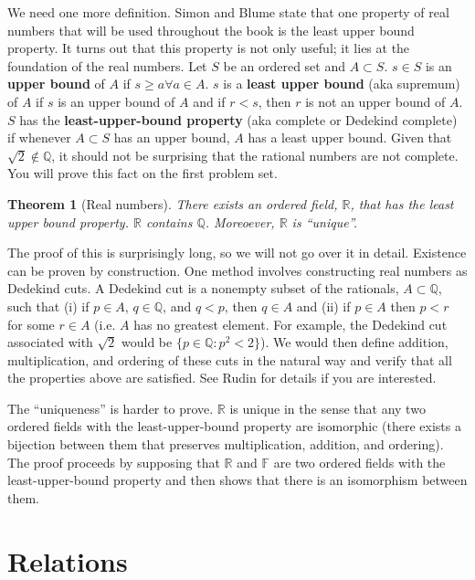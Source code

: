 \documentclass[12pt,reqno]{amsart}
\newtheorem{theorem}{Theorem}[section]
\theoremstyle{definition}
\begin{document}
We need one more definition. Simon and Blume state that one property
of real numbers that will be used throughout the book is the least
upper bound property. It turns out that this property is not only
useful; it lies at the foundation of the real numbers. Let $S$ be an
ordered set and $A \subset S$. $s \in S$ is an \textbf{upper bound} of
$A$ if $s \geq a \forall a \in A$. $s$ is a \textbf{least upper bound}
(aka supremum) of $A$ if $s$ is an upper bound of $A$ and if $r < s$,
then $r$ is not an upper bound of $A$. $S$ has the
\textbf{least-upper-bound property} (aka complete or Dedekind
complete) if whenever $A \subset S$ has an upper bound, $A$ has a
least upper bound. Given that $\sqrt{2} \not\in \mathbb{Q}$, it should
not be surprising that the rational numbers are not complete. You will
prove this fact on the first problem set. 

\begin{theorem}[Real numbers]
  There exists an ordered field, $\mathbb{R}$, that has the least
  upper bound property. $\mathbb{R}$ contains $\mathbb{Q}$. Moreoever,
  $\mathbb{R}$ is ``unique''.
\end{theorem}

The proof of this is surprisingly long, so we will not go over it in
detail. Existence can be proven by construction. One method involves
constructing real numbers as Dedekind cuts. A Dedekind cut is a
nonempty subset of the rationals, $A \subset \mathbb{Q}$, such that
(i) if $p \in A$, $q \in \mathbb{Q}$, and $q < p$, then $q \in A$ and
(ii) if $p \in A$ then $p<r$ for some $r \in A$ (i.e. $A$ has no
greatest element. For example, the Dedekind cut associated with
$\sqrt{2}$ would be $\{p \in \mathbb{Q}: p^2 < 2\}$). We would then
define addition, multiplication, and ordering of these cuts in the
natural way and verify that all the properties above are
satisfied. See Rudin for details if you are interested.

The ``uniqueness'' is harder to prove. $\mathbb{R}$ is unique in the
sense that any two ordered fields with the least-upper-bound property
are isomorphic (there exists a bijection between them that preserves
multiplication, addition, and ordering). The proof proceeds by
supposing that $\mathbb{R}$ and $\mathbb{F}$ are two ordered fields
with the least-upper-bound property and then shows that there is an
isomorphism between them.

\section{Relations}
\end{document}

